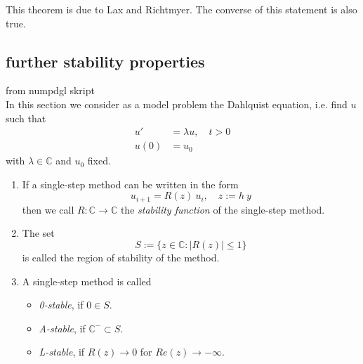 	This theorem is due to Lax and Richtmyer. The converse of this statement is also true. 

	\subsection{further stability properties}
		from numpdgl skript \\
		In this section we consider as a model problem the Dahlquist equation, i.e. find $u$ such that
		\begin{align}
			u' &= \lambda u, \quad t > 0 \\
			u(0) &= u_0
		\end{align}
		with $\lambda \in \mathbb{C}$ and $u_0$ fixed.
		
		\begin{definition}
			\begin{enumerate}
				\item 
				If a single-step method can be written in the form
				\begin{equation}
					u_{i+1} = R(z) \ u_i, \quad z:= h \ y
				\end{equation}
				then we call $R: \mathbb{C} \to \mathbb{C}$ the \emph{stability function} of the single-step method.
				\item 
				The set
				\begin{equation}
					S := \{z \in \mathbb{C} : |R(z)| \leq 1\}
				\end{equation}
				is called the region of stability of the method.
				\item 
				A single-step method is called
				\begin{itemize}
					\item \emph{0-stable}, if $0 \in S$.
					\item \emph{A-stable}, if $\mathbb{C}^- \subset S$.
					\item \emph{L-stable}, if $R(z) \to 0$ for $Re(z) \to -\infty$.
				\end{itemize}
			\end{enumerate}
		\end{definition}

		
		
